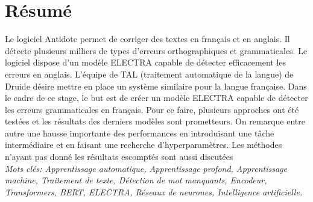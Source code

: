 \documentclass[12pt,twoside,rapport]{dms}
\theoremstyle{definition}
\numberwithin{equation}{section}
\numberwithin{table}{chapter}
\numberwithin{figure}{chapter}
\begin{document}

\maketitle

\maketitle


\francais

\chapter*{Résumé}
Le logiciel Antidote permet de corriger des textes en français et en anglais.
Il détecte plusieurs milliers de types d’erreurs orthographiques et
grammaticales. Le logiciel dispose d'un modèle ELECTRA capable de détecter
efficacement les erreurs en anglais. L'équipe de TAL (traitement automatique de
la langue) de Druide désire mettre en place un système similaire pour la langue
française. Dans le cadre de ce stage, le but est de créer un modèle ELECTRA
capable de détecter les erreurs grammaticales en français. Pour ce faire,
plusieurs approches ont été testées et les résultats des derniers modèles sont
prometteurs. On remarque entre autre une hausse importante des performances en
introduisant une tâche intermédiaire et en faisant une recherche
d'hyperparamètres. Les méthodes n'ayant pas donné les résultats escomptés sont
aussi discutées \\

\textit{Mots clés: Apprentissage automatique, Apprentissage profond,
	Apprentissage machine, Traitement de texte, Détection de mot manquants,
	Encodeur, Transformers, BERT, ELECTRA, Réseaux de neurones, Intelligence
	artificielle.}

\end{document}
